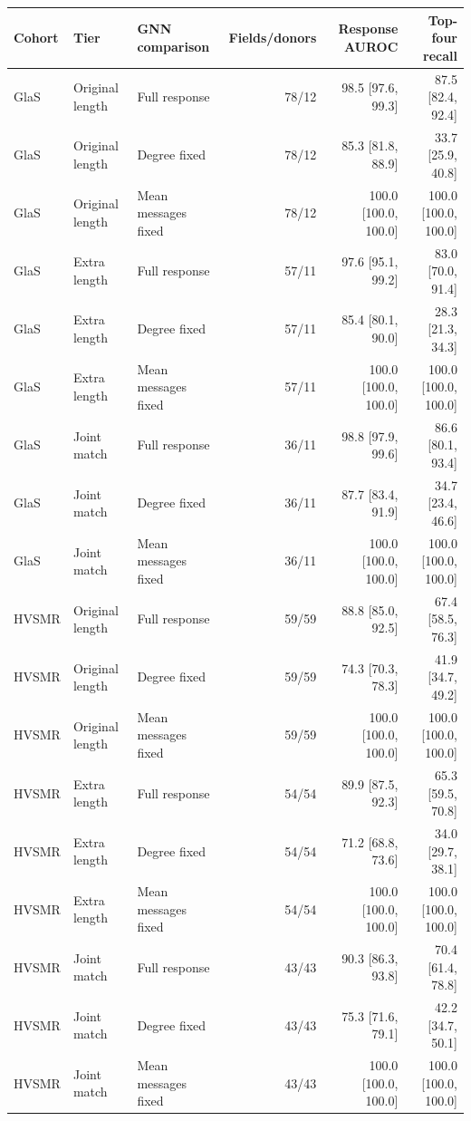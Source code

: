 \begin{tabular}{@{}lllrrr@{}}
\toprule
Cohort & Tier & GNN comparison & Fields/donors & Response AUROC & Top-four recall \\
\midrule
GlaS & Original length & Full response & 78/12 & 98.5 [97.6, 99.3] & 87.5 [82.4, 92.4] \\
GlaS & Original length & Degree fixed & 78/12 & 85.3 [81.8, 88.9] & 33.7 [25.9, 40.8] \\
GlaS & Original length & Mean messages fixed & 78/12 & 100.0 [100.0, 100.0] & 100.0 [100.0, 100.0] \\
GlaS & Extra length & Full response & 57/11 & 97.6 [95.1, 99.2] & 83.0 [70.0, 91.4] \\
GlaS & Extra length & Degree fixed & 57/11 & 85.4 [80.1, 90.0] & 28.3 [21.3, 34.3] \\
GlaS & Extra length & Mean messages fixed & 57/11 & 100.0 [100.0, 100.0] & 100.0 [100.0, 100.0] \\
GlaS & Joint match & Full response & 36/11 & 98.8 [97.9, 99.6] & 86.6 [80.1, 93.4] \\
GlaS & Joint match & Degree fixed & 36/11 & 87.7 [83.4, 91.9] & 34.7 [23.4, 46.6] \\
GlaS & Joint match & Mean messages fixed & 36/11 & 100.0 [100.0, 100.0] & 100.0 [100.0, 100.0] \\
\midrule
HVSMR & Original length & Full response & 59/59 & 88.8 [85.0, 92.5] & 67.4 [58.5, 76.3] \\
HVSMR & Original length & Degree fixed & 59/59 & 74.3 [70.3, 78.3] & 41.9 [34.7, 49.2] \\
HVSMR & Original length & Mean messages fixed & 59/59 & 100.0 [100.0, 100.0] & 100.0 [100.0, 100.0] \\
HVSMR & Extra length & Full response & 54/54 & 89.9 [87.5, 92.3] & 65.3 [59.5, 70.8] \\
HVSMR & Extra length & Degree fixed & 54/54 & 71.2 [68.8, 73.6] & 34.0 [29.7, 38.1] \\
HVSMR & Extra length & Mean messages fixed & 54/54 & 100.0 [100.0, 100.0] & 100.0 [100.0, 100.0] \\
HVSMR & Joint match & Full response & 43/43 & 90.3 [86.3, 93.8] & 70.4 [61.4, 78.8] \\
HVSMR & Joint match & Degree fixed & 43/43 & 75.3 [71.6, 79.1] & 42.2 [34.7, 50.1] \\
HVSMR & Joint match & Mean messages fixed & 43/43 & 100.0 [100.0, 100.0] & 100.0 [100.0, 100.0] \\
\bottomrule
\end{tabular}
